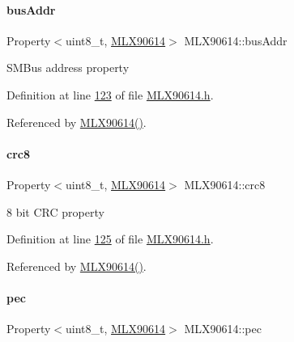 \mbox{\label{class_m_l_x90614_a66d99dc5778b514038c0fa5e25a722f1}} 
\paragraph{\texorpdfstring{bus\+Addr}{busAddr}}
{\footnotesize\ttfamily Property$<$uint8\+\_\+t, \mbox{\hyperlink{class_m_l_x90614}{M\+L\+X90614}}$>$ M\+L\+X90614\+::bus\+Addr}

S\+M\+Bus address property 

Definition at line \mbox{\hyperlink{_m_l_x90614_8h_source_l00123}{123}} of file \mbox{\hyperlink{_m_l_x90614_8h_source}{M\+L\+X90614.\+h}}.



Referenced by \mbox{\hyperlink{_m_l_x90614_8cpp_source_l00046}{M\+L\+X90614()}}.

\mbox{\label{class_m_l_x90614_aa13abb960da5f7d8d0eb26df8632a679}} 
\paragraph{\texorpdfstring{crc8}{crc8}}
{\footnotesize\ttfamily Property$<$uint8\+\_\+t, \mbox{\hyperlink{class_m_l_x90614}{M\+L\+X90614}}$>$ M\+L\+X90614\+::crc8}

8 bit C\+RC property 

Definition at line \mbox{\hyperlink{_m_l_x90614_8h_source_l00125}{125}} of file \mbox{\hyperlink{_m_l_x90614_8h_source}{M\+L\+X90614.\+h}}.



Referenced by \mbox{\hyperlink{_m_l_x90614_8cpp_source_l00046}{M\+L\+X90614()}}.

\mbox{\label{class_m_l_x90614_af050e02eecd12a127a98fb2b30e40a88}} 
\paragraph{\texorpdfstring{pec}{pec}}
{\footnotesize\ttfamily Property$<$uint8\+\_\+t, \mbox{\hyperlink{class_m_l_x90614}{M\+L\+X90614}}$>$ M\+L\+X90614\+::pec}

